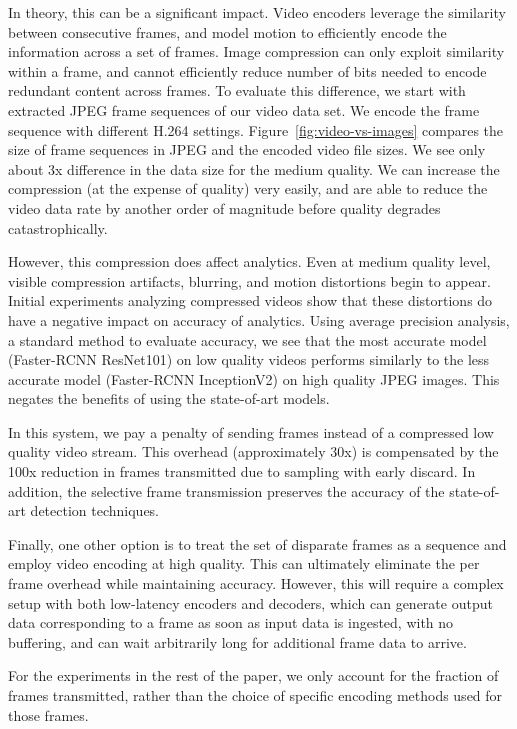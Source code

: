 In theory, this can be a significant impact. Video encoders leverage the
similarity between consecutive frames, and model motion to efficiently encode
the information across a set of frames. Image compression can only exploit
similarity within a frame, and cannot efficiently reduce number of bits needed
to encode redundant content across frames. To evaluate this difference, we start
with extracted JPEG frame sequences of our video data set. We encode the frame
sequence with different H.264 settings. Figure~\ref{fig:video-vs-images}
compares the size of frame sequences in JPEG and the encoded video file sizes.
We see only about 3x difference in the data size for the medium quality. We can
increase the compression (at the expense of quality) very easily, and are able
to reduce the video data rate by another order of magnitude before quality
degrades catastrophically.

However, this compression does affect analytics. Even at medium quality level,
visible compression artifacts, blurring, and motion distortions begin to appear.
Initial experiments analyzing compressed videos show that these distortions do
have a negative impact on accuracy of analytics. Using average precision
analysis, a standard method to evaluate accuracy, we see that the 
most accurate model (Faster-RCNN ResNet101) on low quality videos performs similarly
to the less accurate model (Faster-RCNN InceptionV2) on high quality
JPEG images. This negates the benefits of using the state-of-art models.

In this system, we pay a penalty of sending frames instead of a compressed low
quality video stream. This overhead (approximately 30x) is compensated by the
100x reduction in frames transmitted due to sampling with early discard. In
addition, the selective frame transmission preserves the accuracy of the
state-of-art detection techniques.

Finally, one other option is to treat the set of disparate frames as a sequence
and employ video encoding at high quality. This can ultimately eliminate the per
frame overhead while maintaining accuracy. However, this will require a complex setup with
both low-latency encoders and decoders, which can generate output data
corresponding to a frame as soon as input data is ingested, with no buffering,
and can wait arbitrarily long for additional frame data to arrive. 

For the experiments in the rest of the paper, we only account for the fraction
of frames transmitted, rather than the choice of specific encoding methods used
for those frames.



